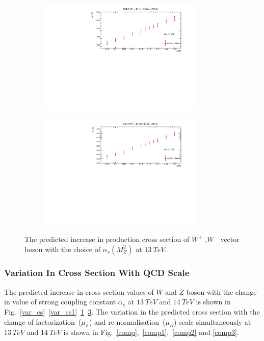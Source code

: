 \begin{figure}[h!]{\label{w+w-_inc}}
\centering
\begin{subfigure}{0.8\textwidth}
\includegraphics[height=5.5cm, width=\textwidth]{chapter4/var_cswp_13.pdf}
\vspace*{-8mm}
\caption{}
\label{var_cs2}
\end{subfigure}
\begin{subfigure}{0.8\textwidth}
\includegraphics[height=5.5cm, width=\textwidth]{chapter4/var_cswm_13.pdf}
\vspace*{-8mm}
\caption{}
\label{var_cs3}
\end{subfigure}
\caption{The predicted increase in production cross section of $W^{+}$ ,$W^{-}$ vector boson with the choice of $\alpha_{s}(M_{Z}^{2})$ at $13~TeV$.}
 \end{figure}

\subsubsection{Variation In Cross Section With QCD Scale}
The predicted increase in cross section values of $W$ and $Z$ boson with the change in value of strong coupling constant $\alpha_{s}$ at $13~TeV$ and $14~TeV$ is shown in Fig.~\ref{var_cs}~\ref{var_cs1}~\ref{var_cs2}~\ref{var_cs3}. The variation in the predicted cross section with the change of factorization~($\mu_{F}$) and re-normalisation~($\mu_{R}$) scale simultaneously at $13~TeV$ and $14~TeV$ is shown in Fig.~\ref{comp},~\ref{comp1},~\ref{comp2} and \ref{comp3}.

